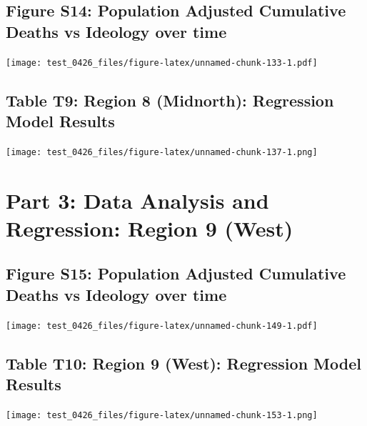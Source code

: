 \documentclass[
]{article}
\begin{document}
\hypertarget{figure-s14-population-adjusted-cumulative-deaths-vs-ideology-over-time}{%
\subsection{Figure S14: Population Adjusted Cumulative Deaths vs
Ideology over
time}\label{figure-s14-population-adjusted-cumulative-deaths-vs-ideology-over-time}}

\texttt{[image: test\_0426\_files/figure-latex/unnamed-chunk-133-1.pdf]}

\hypertarget{table-t9-region-8-midnorth-regression-model-results}{%
\subsection{Table T9: Region 8 (Midnorth): Regression Model
Results}\label{table-t9-region-8-midnorth-regression-model-results}}

\texttt{[image: test\_0426\_files/figure-latex/unnamed-chunk-137-1.png]}

\newpage

\hypertarget{part-3-data-analysis-and-regression-region-9-west}{%
\section{Part 3: Data Analysis and Regression: Region 9
(West)}\label{part-3-data-analysis-and-regression-region-9-west}}

\hypertarget{figure-s15-population-adjusted-cumulative-deaths-vs-ideology-over-time}{%
\subsection{Figure S15: Population Adjusted Cumulative Deaths vs
Ideology over
time}\label{figure-s15-population-adjusted-cumulative-deaths-vs-ideology-over-time}}

\texttt{[image: test\_0426\_files/figure-latex/unnamed-chunk-149-1.pdf]}

\hypertarget{table-t10-region-9-west-regression-model-results}{%
\subsection{Table T10: Region 9 (West): Regression Model
Results}\label{table-t10-region-9-west-regression-model-results}}

\texttt{[image: test\_0426\_files/figure-latex/unnamed-chunk-153-1.png]}

\newpage
\end{document}

